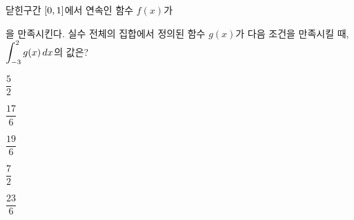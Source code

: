 닫힌구간 $[0{,}\mkern3mu\mathopen{}1]$에서 연속인 함수 $f(x)$가 \par\smallskip{}\par\smallskip\noindent 을 만족시킨다. 실수 전체의 집합에서 정의된 함수 $g(x)$가 다음 조건을 만족시킬 때, $\displaystyle\int_{-3}^{2}g(x)\mkern3mu dx$의 값은? 
\begin{choices32}{\rule[-3ex]{0pt}{8ex}$\dfrac{5}{2}$}{\rule[-3ex]{0pt}{8ex}$\dfrac{17}{6}$}{\rule[-3ex]{0pt}{8ex}$\dfrac{19}{6}$}{\rule[-3ex]{0pt}{8ex}$\dfrac{7}{2}$}{\rule[-3ex]{0pt}{8ex}$\dfrac{23}{6}$}\end{choices32}
